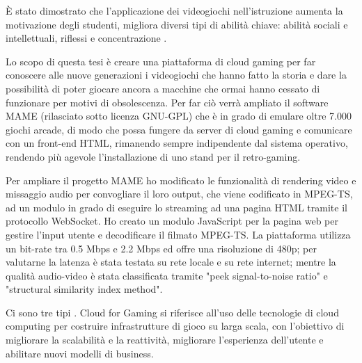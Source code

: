 È stato dimostrato che l'applicazione dei videogiochi nell'istruzione aumenta la motivazione degli studenti, migliora diversi tipi di abilità chiave: abilità sociali e intellettuali, riflessi e concentrazione \parencite{Use_of_Cloud_Gaming_in_Education}.


Lo scopo di questa tesi è creare una piattaforma di cloud gaming per far conoscere alle nuove generazioni i videogiochi che hanno fatto la storia e dare la possibilità di poter giocare ancora a macchine che  ormai hanno cessato di funzionare per motivi di obsolescenza. Per far ciò verrà ampliato il software MAME (rilasciato sotto licenza GNU-GPL) che è in grado di emulare oltre 7.000 giochi arcade, di modo che possa fungere da server di cloud gaming e comunicare con un front-end HTML, rimanendo sempre indipendente dal sistema operativo, rendendo più agevole l’installazione di uno stand per il retro-gaming.



Per ampliare il progetto MAME ho modificato le funzionalità di rendering video e missaggio audio per convogliare il loro output, che viene codificato in MPEG-TS, ad un modulo in grado di eseguire lo streaming ad una pagina HTML tramite il protocollo WebSocket. Ho creato un modulo JavaScript per la pagina web per gestire l'input utente e decodificare il filmato MPEG-TS. La piattaforma utilizza un bit-rate tra 0.5 Mbps e 2.2 Mbps ed offre una risoluzione di 480p; per valutarne la latenza è stata testata su rete locale e su rete internet; mentre la qualità audio-video è stata classificata tramite "peek signal-to-noise ratio" e "structural similarity index method".





Ci sono tre tipi  \parencite{Cloud_for_Gaming}.
Cloud for Gaming si riferisce all'uso delle tecnologie di cloud computing per costruire infrastrutture di gioco su larga scala, con l'obiettivo di migliorare la scalabilità e la reattività, migliorare l'esperienza dell'utente e abilitare nuovi modelli di business.


